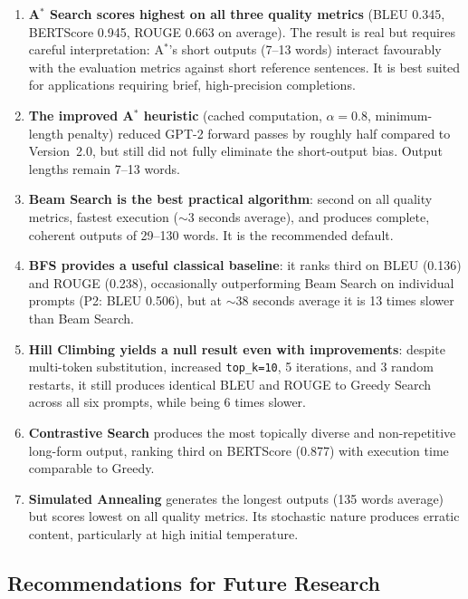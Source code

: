 \documentclass[12pt]{article}
\begin{document}
	\begin{enumerate}[leftmargin=*]
		\item \textbf{A$^*$ Search scores highest on all three quality metrics} (BLEU 0.345, BERTScore 0.945, ROUGE 0.663 on average). The result is real but requires careful interpretation: A$^*$'s short outputs (7--13 words) interact favourably with the evaluation metrics against short reference sentences. It is best suited for applications requiring brief, high-precision completions.
		
		\item \textbf{The improved A$^*$ heuristic} (cached computation, $\alpha = 0.8$, minimum-length penalty) reduced GPT-2 forward passes by roughly half compared to Version~2.0, but still did not fully eliminate the short-output bias. Output lengths remain 7--13 words.
		
		\item \textbf{Beam Search is the best practical algorithm}: second on all quality metrics, fastest execution ($\sim$3 seconds average), and produces complete, coherent outputs of 29--130 words. It is the recommended default.
		
		\item \textbf{BFS provides a useful classical baseline}: it ranks third on BLEU (0.136) and ROUGE (0.238), occasionally outperforming Beam Search on individual prompts (P2: BLEU 0.506), but at $\sim$38 seconds average it is 13 times slower than Beam Search.
		
		\item \textbf{Hill Climbing yields a null result even with improvements}: despite multi-token substitution, increased \texttt{top\_k=10}, 5 iterations, and 3 random restarts, it still produces identical BLEU and ROUGE to Greedy Search across all six prompts, while being 6 times slower.
		
		\item \textbf{Contrastive Search} produces the most topically diverse and non-repetitive long-form output, ranking third on BERTScore (0.877) with execution time comparable to Greedy.
		
		\item \textbf{Simulated Annealing} generates the longest outputs (135 words average) but scores lowest on all quality metrics. Its stochastic nature produces erratic content, particularly at high initial temperature.
	\end{enumerate}
	
	\subsection{Recommendations for Future Research}
	
\end{document}
